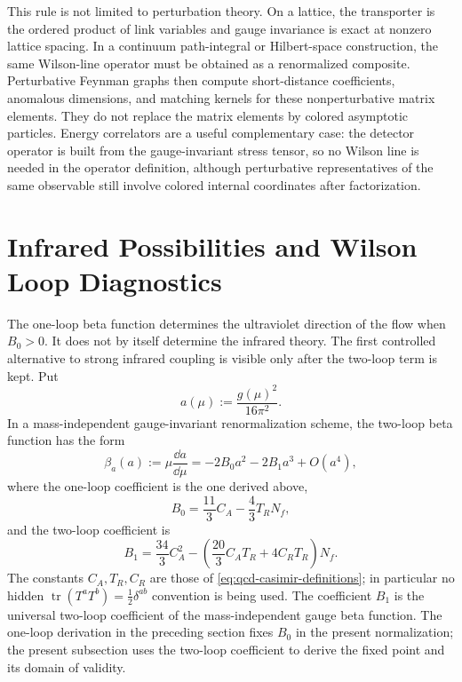 This rule is not limited to perturbation theory.  On a lattice, the transporter
is the ordered product of link variables and gauge invariance is exact at
nonzero lattice spacing.  In a continuum path-integral or Hilbert-space
construction, the same Wilson-line operator must be obtained as a renormalized
composite.  Perturbative Feynman graphs then compute short-distance
coefficients, anomalous dimensions, and matching kernels for these
nonperturbative matrix elements.  They do not replace the matrix elements by
colored asymptotic particles.  Energy correlators are a useful complementary
case: the detector operator is built from the gauge-invariant stress tensor,
so no Wilson line is needed in the operator definition, although perturbative
representatives of the same observable still involve colored internal
coordinates after factorization.

\section{Infrared Possibilities and Wilson Loop Diagnostics}

The one-loop beta function determines the ultraviolet direction of the flow
when \(B_0>0\).  It does not by itself determine the infrared theory.  The
first controlled alternative to strong infrared coupling is visible only after
the two-loop term is kept.  Put
\[
  a(\mu):=\frac{g(\mu)^2}{16\pi^2}.
\]
In a mass-independent gauge-invariant renormalization scheme, the two-loop
beta function has the form
\begin{equation}
  \beta_a(a)
  :=
  \mu\frac{\dd a}{\dd\mu}
  =
  -2B_0a^2-2B_1a^3+O(a^4),
  \label{eq:banks-zaks-beta-a-general}
\end{equation}
where the one-loop coefficient is the one derived above,
\[
  B_0=\frac{11}{3}C_A-\frac{4}{3}T_RN_f,
\]
and the two-loop coefficient is
\begin{equation}
  B_1
  =
  \frac{34}{3}C_A^2
  -
  \left(
    \frac{20}{3}C_AT_R+4C_RT_R
  \right)N_f .
  \label{eq:banks-zaks-two-loop-coefficient}
\end{equation}
The constants \(C_A,T_R,C_R\) are those of
\eqref{eq:qcd-casimir-definitions}; in particular no hidden
\(\operatorname{tr}(T^aT^b)=\frac12\delta^{ab}\) convention is being used.
The coefficient \(B_1\) is the universal two-loop coefficient of the
mass-independent gauge beta function.  The one-loop derivation in the
preceding section fixes \(B_0\) in the present normalization; the present
subsection uses the two-loop coefficient to derive the fixed point and its
domain of validity.

